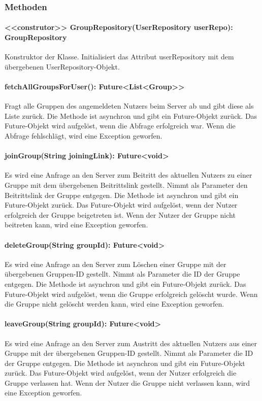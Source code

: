 \documentclass[parskip=full]{scrartcl}
\begin{document}
\subsubsection{Methoden}
\paragraph{<<construtor>> GroupRepository(UserRepository userRepo): GroupRepository}
Konstruktor der Klasse. Initialisiert das Attribut userRepository mit dem übergebenen UserRepository-Objekt.
\paragraph{fetchAllGroupsForUser(): Future<List<Group>>}
Fragt alle Gruppen des angemeldeten Nutzers beim Server ab und gibt diese als Liste zurück. Die Methode ist asynchron und gibt ein Future-Objekt zurück. Das Future-Objekt wird aufgelöst, wenn die Abfrage erfolgreich war. Wenn die Abfrage fehlschlägt, wird eine Exception geworfen.
\paragraph{joinGroup(String joiningLink): Future<void>}
Es wird eine Anfrage an den Server zum Beitritt des aktuellen Nutzers zu einer Gruppe mit dem übergebenen Beitrittslink gestellt. Nimmt als Parameter den Beitrittslink der Gruppe entgegen. Die Methode ist asynchron und gibt ein Future-Objekt zurück. Das Future-Objekt wird aufgelöst, wenn der Nutzer erfolgreich der Gruppe beigetreten ist. Wenn der Nutzer der Gruppe nicht beitreten kann, wird eine Exception geworfen.
\paragraph{deleteGroup(String groupId): Future<void>}
Es wird eine Anfrage an den Server zum Löschen einer Gruppe mit der übergebenen Gruppen-ID gestellt. Nimmt als Parameter die ID der Gruppe entgegen. Die Methode ist asynchron und gibt ein Future-Objekt zurück. Das Future-Objekt wird aufgelöst, wenn die Gruppe erfolgreich gelöscht wurde. Wenn die Gruppe nicht gelöscht werden kann, wird eine Exception geworfen.
\paragraph{leaveGroup(String groupId): Future<void>}
Es wird eine Anfrage an den Server zum Austritt des aktuellen Nutzers aus einer Gruppe mit der übergebenen Gruppen-ID gestellt. Nimmt als Parameter die ID der Gruppe entgegen. Die Methode ist asynchron und gibt ein Future-Objekt zurück. Das Future-Objekt wird aufgelöst, wenn der Nutzer erfolgreich die Gruppe verlassen hat. Wenn der Nutzer die Gruppe nicht verlassen kann, wird eine Exception geworfen.
\end{document}
